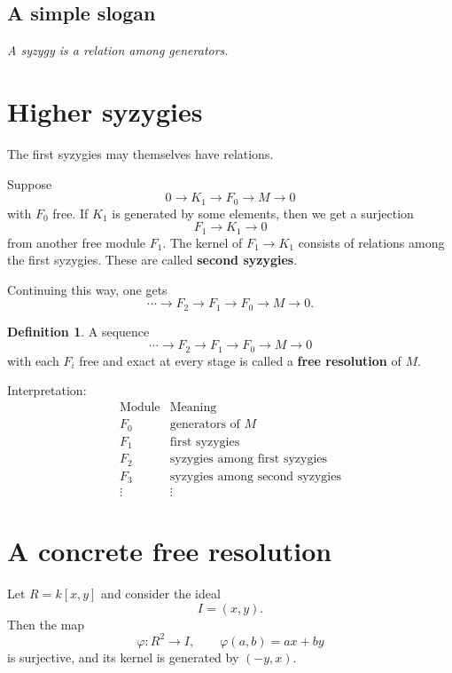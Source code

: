 \documentclass[11pt]{article}
\theoremstyle{definition}
\newtheorem{definition}[theorem]{Definition}
\theoremstyle{remark}
\begin{document}
	\subsection{A simple slogan}
	
	\begin{center}
		\emph{A syzygy is a relation among generators.}
	\end{center}
	
	\section{Higher syzygies}
	
	The first syzygies may themselves have relations.
	
	Suppose
	\[
	0\to K_1\to F_0\to M\to 0
	\]
	with \(F_0\) free. If \(K_1\) is generated by some elements, then we get a surjection
	\[
	F_1\to K_1\to 0
	\]
	from another free module \(F_1\). The kernel of \(F_1\to K_1\) consists of relations among the first syzygies. These are called \textbf{second syzygies}.
	
	Continuing this way, one gets
	\[
	\cdots \to F_2\to F_1\to F_0\to M\to 0.
	\]
	
	\begin{definition}
		A sequence
		\[
		\cdots \to F_2\to F_1\to F_0\to M\to 0
		\]
		with each \(F_i\) free and exact at every stage is called a \textbf{free resolution} of \(M\).
	\end{definition}
	
	Interpretation:
	\[
	\begin{array}{c|c}
		\text{Module} & \text{Meaning} \\
		\hline
		F_0 & \text{generators of }M \\
		F_1 & \text{first syzygies} \\
		F_2 & \text{syzygies among first syzygies} \\
		F_3 & \text{syzygies among second syzygies} \\
		\vdots & \vdots
	\end{array}
	\]
	
	\section{A concrete free resolution}
	
	Let \(R=k[x,y]\) and consider the ideal
	\[
	I=(x,y).
	\]
	Then the map
	\[
	\varphi:R^2\to I,\qquad \varphi(a,b)=ax+by
	\]
	is surjective, and its kernel is generated by \((-y,x)\).
	
\end{document}
